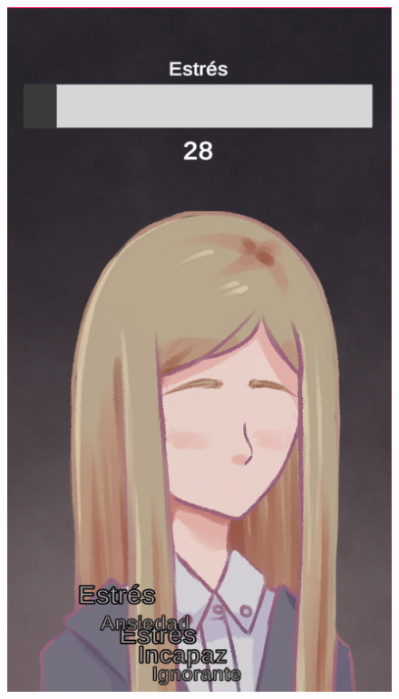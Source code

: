 \begin{figure}[h]
\begin{minipage}{.22\textwidth}
        \includegraphics[width=\textwidth]{imgs/screenshot03.png}
    \end{minipage}
    \begin{minipage}{.22\textwidth}

\end{minipage}
\end{figure}
